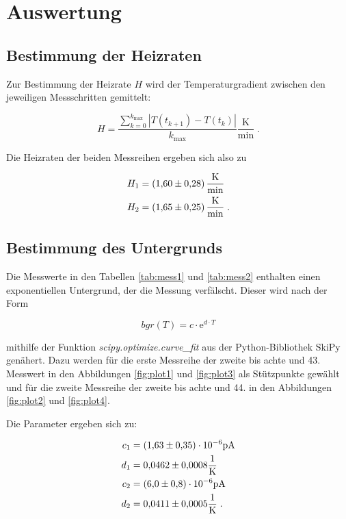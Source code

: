 \section{Auswertung}
\label{sec:Auswertung}

\subsection{Bestimmung der Heizraten}

Zur Bestimmung der Heizrate $H$ wird der Temperaturgradient zwischen den jeweiligen Messschritten gemittelt:

\begin{equation}
  H = \frac{ \sum_{k=0}^{k_\text{max}} |T(t_{k+1}) - T(t_k)|}{k_\text{max}} \frac{\si{\kelvin}}{\si{\minute}} \; .
\end{equation}

Die Heizraten der beiden Messreihen ergeben sich also zu

\begin{align*}
  H_1 &= \SI{1.60 +- 0.28}{\kelvin\per\minute} \\
  H_2 &= \SI{1.65 +- 0.25}{\kelvin\per\minute} \; .
\end{align*}

\subsection{Bestimmung des Untergrunds}

Die Messwerte in den Tabellen \ref{tab:mess1} und \ref{tab:mess2} enthalten einen exponentiellen Untergrund, der
die Messung verfälscht. Dieser wird nach der Form

\begin{equation}
  bgr(T) = c \cdot \text{e}^{d \cdot T}
\end{equation}

mithilfe der Funktion \textit{scipy.optimize.curve\_fit} aus der Python-Bibliothek SkiPy genähert. 
Dazu werden für die erste Messreihe der zweite bis achte und 43. Messwert in den Abbildungen
\ref{fig:plot1} und \ref{fig:plot3} als Stützpunkte gewählt 
und für die zweite Messreihe der zweite bis achte und 44. in den Abbildungen \ref{fig:plot2} und \ref{fig:plot4}.

Die Parameter ergeben sich zu:

\begin{align*}
  c_1 &= (\num{1.63 +- 0.35})\cdot 10^{-6} \si{\pico\ampere} \\
  d_1 &= \num{0.0462 +- 0.0008} \si{\per\kelvin}\\
  c_2 &= (\num{6.0 +- 0.8})\cdot 10^{-6} \si{\pico\ampere}\\
  d_2 &= \num{0.0411 +- 0.0005} \si{\per\kelvin}\; .
\end{align*}

